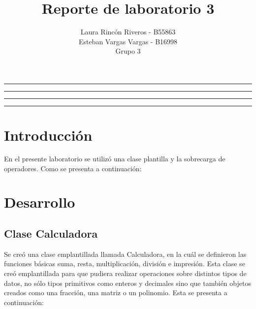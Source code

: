 \documentclass[11pt]{article}
\title{Reporte de laboratorio 3}
\author{Laura Rincón Riveros - B55863\\Esteban Vargas Vargas - B16998\\ Grupo 3}
\begin{document}
\maketitle
\hrule
\hrule
\tableofcontents
\hspace{5mm}
\hrule
\hrule

\section{Introducción}

En el presente laboratorio se utilizó una clase plantilla y la sobrecarga de operadores. Como se presenta a continuación:


\newpage
\section{Desarrollo}

\subsection{Clase Calculadora}

Se creó una clase emplantillada llamada Calculadora, en la cuál se definieron las funciones básicas suma, resta, multiplicación, división e impresión. Esta clase se creó emplantillada para que pudiera realizar operaciones sobre distintos tipos de datos, no sólo tipos primitivos como enteros y decimales sino que también objetos creados como una fracción, una matriz o un polinomio. Esta se presenta a continuación: 
\end{document}
